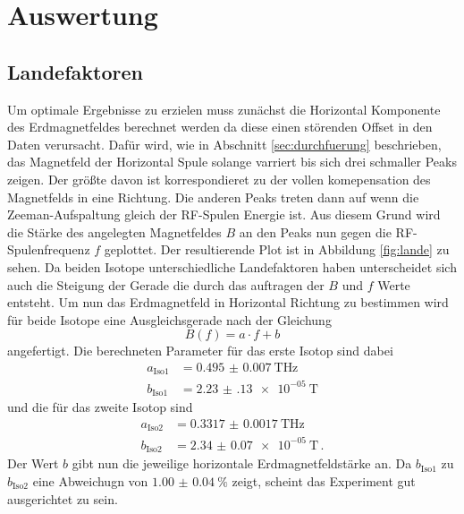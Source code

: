 \newpage
\section{Auswertung}
\label{sec:auswertung}
\subsection{Landefaktoren}
Um optimale Ergebnisse zu erzielen muss zunächst die Horizontal Komponente des Erdmagnetfeldes berechnet werden da diese einen störenden Offset in den Daten verursacht.
Dafür wird, wie in Abschnitt \ref{sec:durchfuerung} beschrieben, das Magnetfeld der Horizontal Spule solange varriert bis sich drei schmaller Peaks zeigen.
Der größte davon ist korrespondieret zu der vollen komepensation des Magnetfelds in eine Richtung.
Die anderen Peaks treten dann auf wenn die Zeeman-Aufspaltung gleich der RF-Spulen Energie ist.
Aus diesem Grund wird die Stärke des angelegten Magnetfeldes $B$ an den Peaks nun gegen die RF-Spulenfrequenz $f$ geplottet.
Der resultierende Plot ist in Abbildung \ref{fig:lande} zu sehen.
Da beiden Isotope unterschiedliche Landefaktoren haben unterscheidet sich auch die Steigung der Gerade die durch das auftragen der $B$ und $f$ Werte entsteht.
Um nun das Erdmagnetfeld in Horizontal Richtung zu bestimmen wird für beide Isotope eine Ausgleichsgerade nach der Gleichung 
\begin{equation}
    B(f) = a\cdot f + b
\end{equation}
angefertigt.
Die berechneten Parameter für das erste Isotop sind dabei 
\begin{align*}
    a_\text{Iso1} & = \SI{0.495(7)}{\tesla\Hz} \\
    b_\text{Iso1} & = \SI{2.23(13)e-05}{\tesla}
\end{align*}
und die für das zweite Isotop sind
\begin{align*}
    a_\text{Iso2} &= \SI{0.3317(17)}{\tesla\Hz}\\ 
    b_\text{Iso2} &= \SI{2.34(7)e-05}{\tesla} \, .
\end{align*}
Der Wert $b$ gibt nun die jeweilige horizontale Erdmagnetfeldstärke an.
Da $b_\text{Iso1}$ zu $b_\text{Iso2}$ eine Abweichugn von $\SI{1.00(4)}{}\%$ zeigt, scheint das Experiment gut ausgerichtet zu sein.
